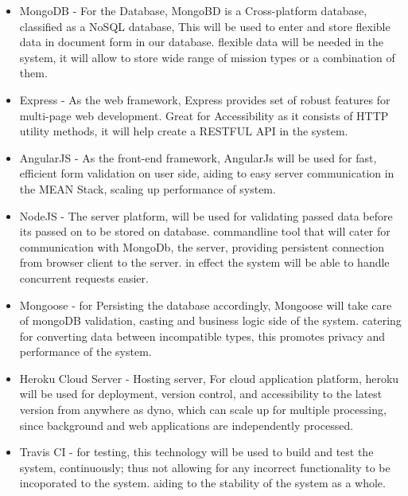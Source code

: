 \documentclass{article}
\begin{document}
	 \begin{itemize}
	 	
	 	
	 	
	 	\item MongoDB - For the Database, MongoBD is a Cross-platform database, classified as a NoSQL database, This will be used to enter and store flexible data in document form in our database. flexible data will be needed in the system, it will allow to store wide range of mission types or a combination of them.
	 	
	 	
	 	\item Express - As the web framework, Express provides set of robust features for multi-page web development. Great for Accessibility as it consists of HTTP utility methods, it will help create a RESTFUL API in the system.
	 	
	 	
	 	\item AngularJS - As the front-end framework, AngularJs will be used for fast, efficient form validation on user side, aiding to easy server communication in the MEAN Stack, scaling up performance of system.     
	 	
	 	
	 	\item NodeJS - The server platform, will be used for validating passed data before its passed on to be stored on database. commandline  tool that will cater for  communication with MongoDb, the server, providing persistent connection from browser client to the server. in effect the system will be able to handle concurrent requests easier.
	 	
	 	\item Mongoose - for Persisting the database accordingly, Mongoose will take care of mongoDB validation, casting and business logic side of the system. catering for converting data between incompatible types, this promotes privacy and performance of the system.  
	 	
	 	
	 	\item Heroku Cloud Server - Hosting server, For cloud application platform, heroku will be used for deployment, version control, and accessibility to the latest version from anywhere as dyno, which can scale up for multiple processing, since background and web applications are independently processed.
	 	
	 	\item Travis CI - for testing, this technology will be used to build and test the system, continuously; thus not allowing for any incorrect functionality to be incoporated to the system. aiding to the stability of the system as a whole.   
	 	
	 	
	 \end{itemize}
	 
	
	
	
	
\end{document}

